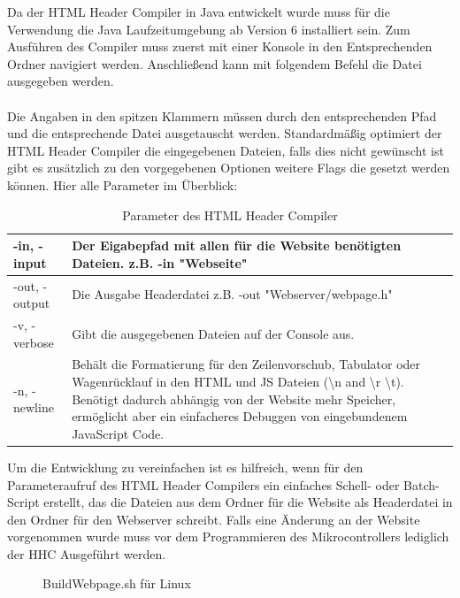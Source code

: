 Da der HTML Header Compiler in Java entwickelt wurde muss für die Verwendung die
Java Laufzeitumgebung ab Version 6 installiert sein. Zum Ausführen des Compiler
muss zuerst mit einer Konsole in den Entsprechenden Ordner navigiert werden.
Anschließend kann mit folgendem Befehl die Datei ausgegeben werden. 
\\

\\

Die Angaben in den spitzen Klammern müssen durch den entsprechenden Pfad und
die entsprechende Datei ausgetauscht werden. Standardmäßig optimiert der
HTML Header Compiler die eingegebenen Dateien, falls dies nicht gewünscht ist
gibt es zusätzlich zu den vorgegebenen Optionen weitere Flags
die gesetzt werden können. Hier alle Parameter im Überblick:

\begin{table}[H]
\begin{tabular}{| p{} | p{} |}
\hline
-in, -input & Der Eigabepfad mit allen für die Website benötigten Dateien. z.B. \textrm{-in "Webseite"} \\ \hline 
-out, -output & Die Ausgabe Headerdatei z.B. \textrm{-out "Webserver/webpage.h"} \\ \hline
-v, -verbose &  Gibt die ausgegebenen Dateien auf der Console aus. \\  
 \hline 
 -n, -newline & Behält die Formatierung für den Zeilenvorschub, Tabulator
 oder Wagenrücklauf in den HTML und JS Dateien (\textbackslash n and
 \textbackslash r \textbackslash t).
 Benötigt dadurch abhängig von der Website mehr Speicher, ermöglicht aber ein
 einfacheres Debuggen von eingebundenem JavaScript Code.  \\ \hline
\end{tabular}
\caption{Parameter des HTML Header Compiler}
\label{parameterHHC}
\end{table}

Um die Entwicklung zu vereinfachen ist es hilfreich, wenn für den Parameteraufruf
des HTML Header Compilers ein einfaches Schell- oder Batch-Script erstellt, das
die Dateien aus dem Ordner für die Website als Headerdatei in den Ordner für den
Webserver schreibt. Falls eine Änderung an der Website vorgenommen wurde muss
vor dem Programmieren des Mikrocontrollers lediglich der \ac{HHC} Ausgeführt
werden.

\begin{figure}[H]

\caption{BuildWebpage.sh für Linux}
\label{output}
\end{figure}


